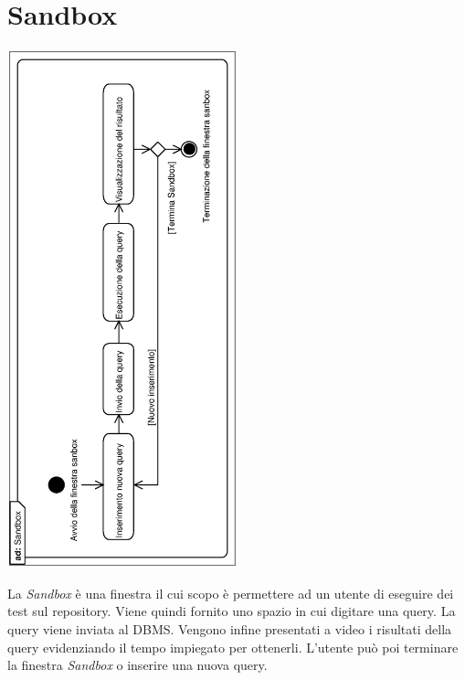 \documentclass[11pt,titlepage,a4paper]{report}
\begin{document}
\section{Sandbox}
\begin{center}
 \includegraphics[width=0.5\textwidth, angle=-90]{Sandbox.eps}
\end{center}
La \textit{Sandbox} \`e una finestra il cui scopo \`e permettere ad un utente di eseguire dei test sul repository. Viene quindi fornito uno spazio in cui digitare una query. La query viene inviata al DBMS. Vengono infine presentati a video i risultati della query evidenziando il tempo impiegato per ottenerli. L'utente pu\`o poi terminare la finestra \textit{Sandbox} o inserire una nuova query.
\end{document}
